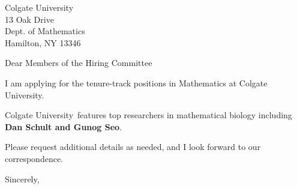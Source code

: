 




	
	
	\def\School{Colgate University}
	
	\begin{letter}
		{Colgate University\\
			13 Oak Drive\\
			Dept. of Mathematics\\
			Hamilton, NY 13346
		}
		
		\opening{Dear Members of the Hiring Committee}
		
		
		I am applying for the tenure-track positions in Mathematics at \School. 
		
		
		\School~features top researchers in mathematical biology including \textbf{Dan Schult and Gunog Seo}. 
		
		
		
		
		
		Please request additional details as needed, and I look forward to our correspondence.
		
		\closing{Sincerely,}
	\end{letter}
